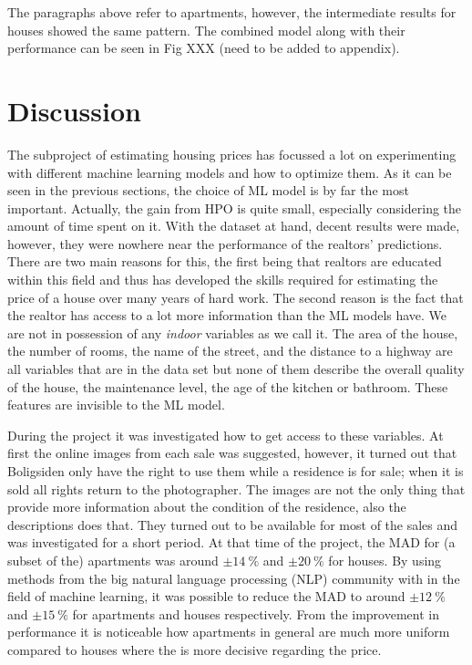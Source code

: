 The paragraphs above refer to apartments, however, the intermediate results for houses showed the same pattern. The combined model along with their performance can be seen in Fig XXX (need to be added to appendix). 

\section{Discussion}
\label{sec:h:discussion}

The subproject of estimating housing prices has focussed a lot on experimenting with different machine learning models and how to optimize them. As it can be seen in the previous sections, the choice of ML model is by far the most important. Actually, the gain from HPO is quite small, especially considering the amount of time spent on it. With the dataset at hand, decent results were made, however, they were nowhere near the performance of the realtors' predictions. There are two main reasons for this, the first being that realtors are educated within this field and thus has developed the skills required for estimating the price of a house over many years of hard work. The second reason is the fact that the realtor has access to a lot more information than the ML models have. We are not in possession of any \emph{indoor} variables as we call it. The area of the house, the number of rooms, the name of the street, and the distance to a highway are all variables that are in the data set but none of them describe the overall quality of the house, the maintenance level, the age of the kitchen or bathroom. These features are invisible to the ML model. 

During the project it was investigated how to get access to these variables. At first the online images from each sale was suggested, however, it turned out that Boligsiden only have the right to use them while a residence is for sale; when it is sold all rights return to the photographer. The images are not the only thing that provide more information about the condition of the residence, also the descriptions does that. They turned out to be available for most of the sales and was investigated for a short period. At that time of the project, the MAD for (a subset of the) apartments was around $\pm \SI{14}{\percent}$ and $\pm \SI{20}{\percent}$ for houses. By using methods from the big natural language processing (NLP) community with in the field of machine learning, it was possible to reduce the MAD to around $\pm \SI{12}{\percent}$ and $\pm \SI{15}{\percent}$ for apartments and houses respectively. From the improvement in performance it is noticeable how apartments in general are much more uniform compared to houses where the  is more decisive regarding the price. 


